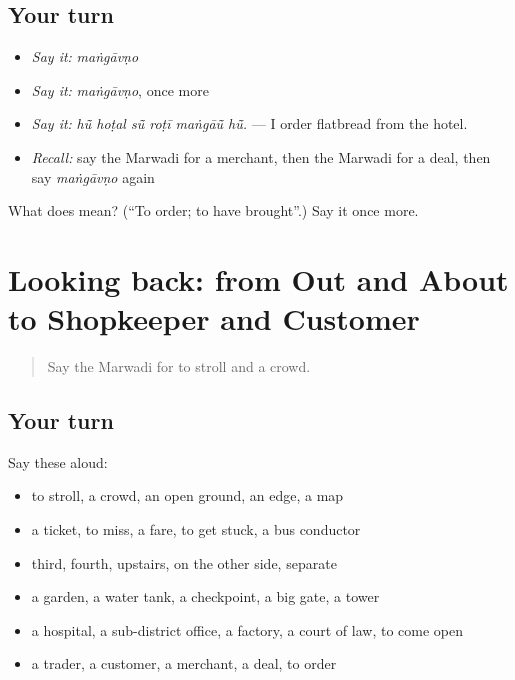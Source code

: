 \subsection*{Your turn}
\begin{itemize}
\raggedright
  \item \emph{Say it:} \emph{maṅgāvṇo}
  \item \emph{Say it:} \emph{maṅgāvṇo}, once more
  \item \emph{Say it:} \emph{hū̃ hoṭal sū̃ roṭī maṅgāū̃ hū̃.} — I order flatbread from the hotel.
  \item \emph{Recall:} say the Marwadi for a merchant, then the Marwadi for a deal, then say \emph{maṅgāvṇo} again
\end{itemize}

\begin{tcolorbox}[breakable,colback=teal!4,colframe=teal!35!black,title={Before you move on}]
What does  mean? (\textquotedblleft{}To order; to have brought\textquotedblright{}.) Say it once more.
\end{tcolorbox}
\section[(dialogue)]{Looking back: from Out and About to Shopkeeper and Customer}

\label{lesson:MW-R209-review-204-209}



\begin{quote}
Say the Marwadi for to stroll and a crowd.
\end{quote}

\subsection*{Your turn}
Say these aloud:

\begin{itemize}
\raggedright
  \item to stroll, a crowd, an open ground, an edge, a map
  \item a ticket, to miss, a fare, to get stuck, a bus conductor
  \item third, fourth, upstairs, on the other side, separate
  \item a garden, a water tank, a checkpoint, a big gate, a tower
  \item a hospital, a sub-district office, a factory, a court of law, to come open
  \item a trader, a customer, a merchant, a deal, to order
\end{itemize}

